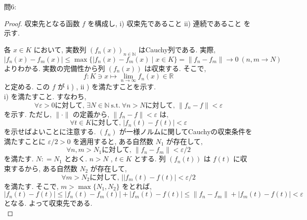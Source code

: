 \documentclass[dvipdfmx,uplatex,11pt]{jsarticle}
\theoremstyle{definition}
\begin{document}
\newpage

問6:\\
\dotfill
\begin{leftbar}
	\begin{proof}
	収束先となる函数 $f$ を構成し, i) 収束先であること ii) 連続であること  を示す. 
	
	各 $x \in K$ において, 実数列 $( f_n ( x ) ) _ {n \in \mathbb N}$ はCauchy列である. 実際, 
%		
		\[
			| f _n ( x ) - f _m ( x ) | \leq \max \{ | f_n ( x ) - f_m ( x ) \mid x \in K \} = \| f_n - f_m \| \to 0 \ ( n , m \to N )
		\]
%		
	よりわかる. 実数の完備性から列 $( f_n ( x ) )$ は収束する. そこで, 
%		
		\[
			f : K \ni x \mapsto \lim_{n \to \infty} f_n ( x ) \in \mathbb R
		\]
%		
	と定める. この $f$ が i ) , ii ) を満たすことを示す. \\
	i) を満たすこと. すなわち, 
%		
		\[
			\forall \varepsilon > 0 \text {に対して, } \exists N \in \mathbb N \ \mathrm{s.t.} \ \forall n > N \text {に対して, } \| f_n - f \| < \varepsilon
		\]
%
	を示す. ただし, $\| \cdot \|$ の定義から, $\| f_n - f \| < \varepsilon$ は, 
%		
		\[
			\forall t \in K \text {に対して, } | f_n ( t ) - f ( t ) | < \varepsilon
		\]
%		
	を示せばよいことに注意する. $( f_n )$ が一様ノルムに関してCauchyの収束条件を満たすことに $\varepsilon / 2 > 0$ を適用すると, ある自然数 $N_1$ が存在して, 
%		
		\[
			\forall n , m > N _1 \text {に対して, } \| f_n - f_m \| < \varepsilon / 2
		\]
%		
	を満たす. $N : = N_1$ とおく. $n > N$ , $t \in K$ とする. 列 $( f_n ( t ) )$ は $f (t)$ に収束するから, ある自然数 $N_2$ が存在して, 
%		
		\[
			\forall m > N_2 \text {に対して, }| | f_{m} ( t ) - f ( t ) | < \varepsilon / 2
		\] 
%		
	を満たす. そこで, $m > \max \{ N_1 , N_2 \}$ をとれば, 
%		
		\[
			| f_n ( t ) - f ( t ) | \leq | f_n ( t ) - f_m ( t ) | + | f _m ( t ) - f ( t ) | \leq \| f_n - f_m \| + | f_m ( t ) - f ( t ) | < \varepsilon
		\] 
%		
	となる. よって収束先である. \\
	

\end{proof}
\end{leftbar}
\end{document}
